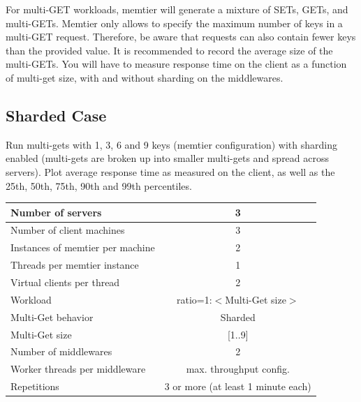 \documentclass[11pt,a4paper]{article}
\begin{document}
For multi-GET workloads, memtier will generate a mixture of SETs, GETs, and multi-GETs. Memtier only allows to specify the maximum number of keys in a multi-GET request. Therefore, be aware that requests can also contain fewer keys than the provided value. It is recommended to record the average size of the multi-GETs. You will have to measure response time on the client as a function of multi-get size, with and without sharding on the middlewares.

\subsection{Sharded Case}

Run multi-gets with 1, 3, 6 and 9 keys (memtier configuration) with sharding enabled (multi-gets are broken up into smaller multi-gets and spread across servers). Plot average response time as measured on the client, as well as the 25th, 50th, 75th, 90th and 99th percentiles.

\begin{center}
	\scriptsize{
		\begin{tabular}{|l|c|}
			\hline Number of servers                & 3                       \\ 
			\hline Number of client machines        & 3                       \\ 
			\hline Instances of memtier per machine & 2                       \\ 
			\hline Threads per memtier instance     & 1                       \\
			\hline Virtual clients per thread       & 2     		            \\ 
			\hline Workload                         & ratio=1:$<$Multi-Get size$>$             \\
			\hline Multi-Get behavior               & Sharded                 \\
			\hline Multi-Get size                   & [1..9]                  \\
			\hline Number of middlewares            & 2                       \\
			\hline Worker threads per middleware    & max. throughput config. \\
			\hline Repetitions                      & 3 or more (at least 1 minute each)               \\ 
			\hline 
		\end{tabular}
	} 
\end{center}
\end{document}
